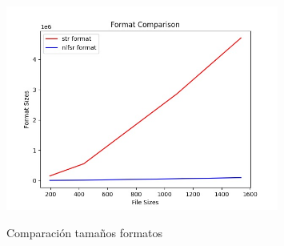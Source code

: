 \begin{figure}[h] %
    \centering
    \includegraphics[width=0.8\textwidth,keepaspectratio]{img/format_comparison_graph.jpeg}
    \parbox{\linewidth}{\centering Comparación tamaños formatos}
    \label{fig:mi_imagen} 
\end{figure}
